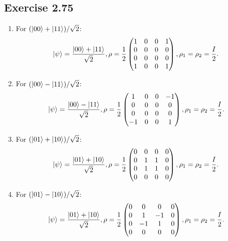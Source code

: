 \subsection*{Exercise 2.75}
\begin{enumerate}[(1)]
    \item For $(\ket{00}+\ket{11})/\sqrt{2}$:
    \begin{align}
\ket{\psi}=\frac{\ket{00}+\ket{11}}{\sqrt{2}},\rho = \frac{1}{2}\begin{pmatrix}
1&0&0&1\\0&0&0&0\\0&0&0&0\\1&0&0&1
\end{pmatrix},
\rho_1=\rho_2 = \frac{I}{2}.
\end{align}

\item For $(\ket{00}-\ket{11})/\sqrt{2}$:
\begin{align}
\ket{\psi}=\frac{\ket{00}-\ket{11}}{\sqrt{2}},\rho = \frac{1}{2}\begin{pmatrix}
1&0&0&-1\\0&0&0&0\\0&0&0&0\\-1&0&0&1
\end{pmatrix},
\rho_1=\rho_2 = \frac{I}{2}.
\end{align}

\item For $(\ket{01}+\ket{10})/\sqrt{2}$:
\begin{align}
\ket{\psi}=\frac{\ket{01}+\ket{10}}{\sqrt{2}},\rho = \frac{1}{2}\begin{pmatrix}
0&0&0&0\\0&1&1&0\\0&1&1&0\\0&0&0&0
\end{pmatrix},
\rho_1=\rho_2 = \frac{I}{2}.
\end{align}

\item For $(\ket{01}-\ket{10})/\sqrt{2}$:
\begin{align}
\ket{\psi}=\frac{\ket{01}+\ket{10}}{\sqrt{2}},\rho = \frac{1}{2}\begin{pmatrix}
0&0&0&0\\0&1&-1&0\\0&-1&1&0\\0&0&0&0
\end{pmatrix},
\rho_1=\rho_2 = \frac{I}{2}.
\end{align}

\end{enumerate}

